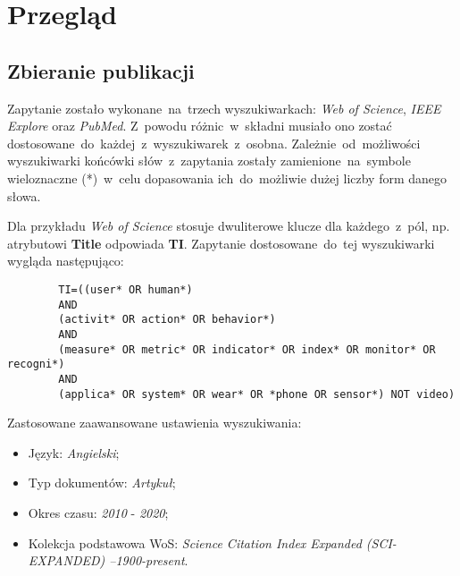 \section{Przegląd}

\subsection{Zbieranie publikacji}
Zapytanie zostało wykonane~na~trzech wyszukiwarkach: \textit{Web of Science}, \textit{IEEE Explore} oraz \textit{PubMed}. Z~powodu różnic~w~składni musiało ono zostać dostosowane~do~każdej~z~wyszukiwarek~z~osobna. Zależnie~od~możliwości wyszukiwarki końcówki słów~z~zapytania zostały zamienione~na~symbole wieloznaczne (*)~w~celu dopasowania ich~do~możliwie dużej liczby form danego słowa.

Dla przykładu \textit{Web of Science} stosuje dwuliterowe klucze dla każdego~z~pól, np. atrybutowi {\bf Title} odpowiada {\bf TI}. Zapytanie dostosowane~do~tej wyszukiwarki wygląda następująco:

\bigskip
\begin{center}
	\begin{minipage}{0.85\linewidth}
		\begin{verbatim}
		TI=((user* OR human*) 
		AND 
		(activit* OR action* OR behavior*)
		AND 
		(measure* OR metric* OR indicator* OR index* OR monitor* OR recogni*) 
		AND 
		(applica* OR system* OR wear* OR *phone OR sensor*) NOT video)
		\end{verbatim}
	\end{minipage}
\end{center}
\bigskip

\noindent Zastosowane zaawansowane ustawienia wyszukiwania:
\begin{itemize}
    \item Język: {\it Angielski};
    \item Typ dokumentów: {\it Artykuł};
    \item Okres czasu: {\it 2010} - {\it 2020};
    \item Kolekcja podstawowa WoS: {\it Science Citation Index Expanded (SCI-EXPANDED) --1900-present}.
\end{itemize}

